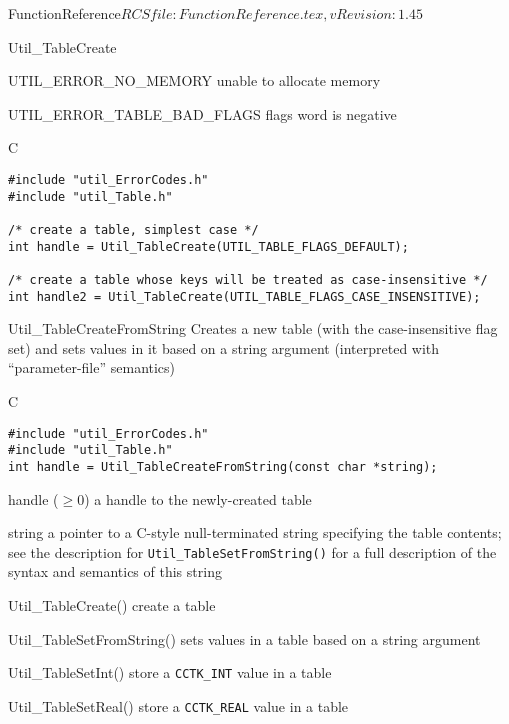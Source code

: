 \begin{cactuspart}{5}{FunctionReference}{$RCSfile: FunctionReference.tex,v $}{$Revision: 1.45 $}
\begin{FunctionDescription}{Util\_TableCreate}
\begin{Error}{UTIL\_ERROR\_NO\_MEMORY}
unable to allocate memory
\end{Error}
\begin{Error}{UTIL\_ERROR\_TABLE\_BAD\_FLAGS}
flags word is negative
\end{Error}

\begin{Example}{C}
\begin{verbatim}
#include "util_ErrorCodes.h"
#include "util_Table.h"

/* create a table, simplest case */
int handle = Util_TableCreate(UTIL_TABLE_FLAGS_DEFAULT);

/* create a table whose keys will be treated as case-insensitive */
int handle2 = Util_TableCreate(UTIL_TABLE_FLAGS_CASE_INSENSITIVE);
\end{verbatim}
\end{Example}
\end{FunctionDescription}


\begin{FunctionDescription}{Util\_TableCreateFromString}
\label{Util-TableCreateFromString}
Creates a new table (with the case-insensitive flag set) and sets
values in it based on a string argument (interpreted with
``parameter-file'' semantics)

\begin{Synopsis}{C}
\begin{verbatim}
#include "util_ErrorCodes.h"
#include "util_Table.h"
int handle = Util_TableCreateFromString(const char *string);
\end{verbatim}
\end{Synopsis}

\begin{Result}{handle ($\ge 0$)}
a handle to the newly-created table
\end{Result}

\begin{Parameter}{string}
a pointer to a C-style null-terminated string specifying the table
contents; see the description for \verb|Util_TableSetFromString()|
for a full description of the syntax and semantics of this string
\end{Parameter}

\begin{SeeAlso}{Util\_TableCreate()}
create a table
\end{SeeAlso}
\begin{SeeAlso}{Util\_TableSetFromString()}
sets values in a table based on a string argument
\end{SeeAlso}
\begin{SeeAlso}{Util\_TableSetInt()}
store a \verb|CCTK_INT| value in a table
\end{SeeAlso}
\begin{SeeAlso}{Util\_TableSetReal()}
store a \verb|CCTK_REAL| value in a table
\end{SeeAlso}


\end{FunctionDescription}
\end{cactuspart}
